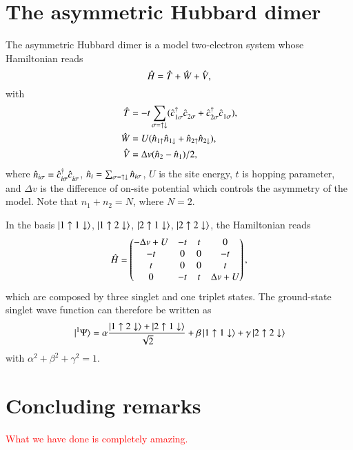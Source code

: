 \documentclass[aps,prb,reprint,noshowkeys,superscriptaddress]{revtex4-1}
\newcommand{\titou}[1]{\textcolor{red}{#1}}
\newcommand{\Ne}{N}
\newcommand{\hH}{\Hat{H}}
\newcommand{\hT}{\Hat{T}}
\newcommand{\hW}{\Hat{W}}
\newcommand{\hV}{\Hat{V}}
\newcommand{\hc}[2]{\Hat{c}_{#1}^{#2}}
\newcommand{\hn}[1]{\Hat{n}_{#1}}
\newcommand{\n}[1]{n_{#1}}
\newcommand{\Dv}{\Delta v}
\newcommand{\up}{\uparrow}
\newcommand{\dw}{\downarrow}
\newcommand{\updw}{\up\dw}
\begin{document}
\section{The asymmetric Hubbard dimer}


The asymmetric Hubbard dimer is a model two-electron system whose Hamiltonian reads
\begin{equation}
	\hH = \hT + \hW + \hV,
\end{equation}
with
\begin{subequations}
\begin{align}
	\hT		& = - t \sum_{\sigma=\updw} (\hc{1\sigma}{\dag} \hc{2\sigma}{} + \hc{2\sigma}{\dag} \hc{1\sigma}{}),
	\\
	\hW	& =  U (\hn{1\up}\hn{1\dw} + \hn{2\up}\hn{2\dw}),
	\\
	\hV	& = \Dv (\hn{2} - \hn{1})/2,
\end{align}
\end{subequations}
where $\hn{i\sigma} = \hc{i\sigma}{\dag} \hc{i\sigma}{}$, $\hn{i} = \sum_{\sigma=\updw} \hn{i\sigma}$,  $U$ is the site energy, $t$ is hopping parameter, and $\Dv$ is the difference of on-site potential which controls the asymmetry of the model.
Note that $\n{1} + \n{2} = \Ne$, where $\Ne = 2$.

In the basis $\ket{1\up1\dw}$, $\ket{1\up2\dw}$, $\ket{2\up1\dw}$, $\ket{2\up2\dw}$, the Hamiltonian reads
\begin{equation}
	\hH = 
	\begin{pmatrix}
	- \Dv + U	&	-t	&	t	&	0		\\
	-t			&	0	&	0	&	-t		\\
	t			&	0	&	0	&	t		\\
	0			&	-t	&	t	&	\Dv + U	\\
	\end{pmatrix},
\end{equation}
which are composed by three singlet and one triplet states.
The ground-state singlet wave function can therefore be written as
\begin{equation}
	\ket*{^{1}\Psi} = \alpha \frac{\ket{1\up2\dw} + \ket{2\up1\dw}}{\sqrt{2}} + \beta \ket{1\up1\dw} + \gamma \ket{2\up2\dw}
\end{equation}
with $\alpha^2 + \beta^2 + \gamma^2 = 1$.

\section{Concluding remarks}
\titou{What we have done is completely amazing.}
\end{document}

